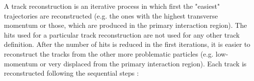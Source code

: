 A track reconstruction is an iterative process in which first the "easiest" trajectories are reconstructed (e.g. the ones with the highest
transverse momentum or those, which are produced in the primary interaction region). The hits used for a particular track reconstruction 
are not used for any other track definition. After the number of hits is reduced in the first iterations, it is easier to reconstruct the
tracks from the other more problematic particles (e.g. low-momentum or very displaced from the primary interaction region). Each track is reconstructed
following the sequential steps \cite{Chatrchyan:2014fea}:

% 
% 
% 
% 
